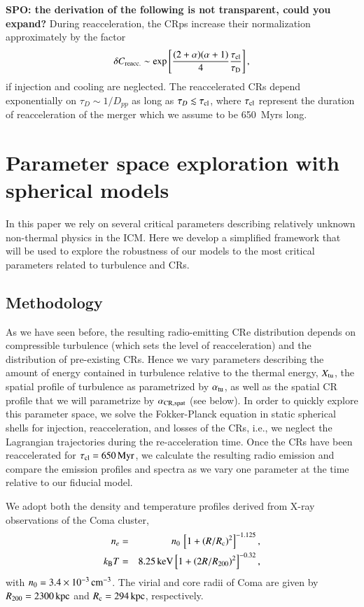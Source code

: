 \documentclass[fleqn,usenatbib,useAMS]{mnras}
\def\SPO#1{{\bf {\color{red} SPO: #1}}}
\begin{document}
\SPO{the derivation of the following is not transparent, could you expand?}
During reacceleration, the CRps increase their normalization
approximately by the factor
\begin{equation}
  \label{eq:Creacc}
  \delta C_{\mathrm{reacc.}} \sim 
  \exp{\left[\frac{(2+\alpha)(\alpha+1)}{4}\frac{\tau_{\mathrm{cl}}}{\tau_{\mathrm{D}}}\right]}\,,
\end{equation}
if injection and cooling are neglected. The reaccelerated CRs depend
exponentially on $\tau_D\sim 1/D_{pp}$ as long as $\tau_D \lesssim
\tau_{\mathrm{cl}}$, where $\tau_{\mathrm{cl}}$ represent the duration of
reacceleration of the merger which we assume to be 650~Myrs long.


\section{Parameter space exploration with spherical models}
\label{sect:param_comp}
In this paper we rely on several critical parameters describing
relatively unknown non-thermal physics in the ICM. Here we develop a
simplified framework that will be used to explore the robustness of
our models to the most critical parameters related to turbulence and
CRs.


\subsection{Methodology}

As we have seen before, the resulting radio-emitting CRe distribution
depends on compressible turbulence (which sets the level of
reacceleration) and the distribution of pre-existing CRs. Hence we
vary parameters describing the amount of energy contained in
turbulence relative to the thermal energy, $X_{\rm tu}$, the spatial
profile of turbulence as parametrized by $\alpha_{\rm tu}$, as well as
the spatial CR profile that we will parametrize by $\alpha_{\rm CR,
  spat}$ (see below).  In order to quickly explore this parameter
space, we solve the Fokker-Planck equation in static spherical shells
for injection, reacceleration, and losses of the CRs, i.e., we neglect
the Lagrangian trajectories during the re-acceleration time.  Once the
CRs have been reaccelerated for $\tau_{\mathrm{cl}} = 650\,{\mathrm{Myr}}$, we
calculate the resulting radio emission and compare the emission
profiles and spectra as we vary one parameter at the time relative to
our fiducial model.

We adopt both the density \citep{1992A&A...259L..31B} and temperature
profiles \citep{2009ApJ...696.1886B,2001A&A...365L..67A} derived from
X-ray observations of the Coma cluster,
\begin{eqnarray}
n_e &=& n_0\,\left[1+\left(R/R_{{\mathrm{c}}}\right)^2\right]^{-1.125},\nonumber\\
k_{{\mathrm{B}}} T &=& 8.25\,{\mathrm{keV}} \left[1+\left(2R/R_{200}\right)^2\right]^{-0.32},
\end{eqnarray}
with $n_0=3.4\times10^{-3}\,{\mathrm{cm}}^{-3}$.  The virial and core radii
of Coma are given by $R_{200} = 2300\,{\mathrm{kpc}}$
\citep{2002ApJ...567..716R} and $R_{{\mathrm{c}}} = 294\,{\mathrm{kpc}}$,
respectively.
\end{document}
